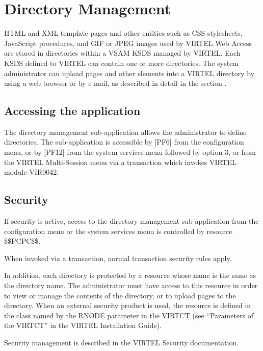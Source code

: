 \documentclass[letterpaper,10pt,english]{sphinxmanual}
\begin{document}
\section{Directory Management}
\label{\detokenize{User_Guide:directory-management}}\label{\detokenize{User_Guide:v457ug-directory-management}}
HTML and XML template pages and other entities such as CSS stylesheets, JavaScript procedures, and GIF or JPEG images used by VIRTEL Web Access are stored in directories within a VSAM KSDS managed by VIRTEL. Each KSDS defined to VIRTEL can contain one or more directories. The system administrator can upload pages and other elements into a VIRTEL directory by using a web browser or by e-mail, as described in detail in the section {\hyperref[\detokenize{User_Guide:v457ug-uploading-html-pages}]{}}.


\subsection{Accessing the application}
\label{\detokenize{User_Guide:accessing-the-application}}
The directory management sub-application allows the administrator to define directories. The sub-application is accessible by {[}PF6{]} from the configuration menu, or by {[}PF12{]} from the system services menu
followed by option 3, or from the VIRTEL Multi-Session menu via a transaction which invokes VIRTEL module VIR0042.


\subsection{Security}
\label{\detokenize{User_Guide:security}}
If security is active, access to the directory management sub-application from the configuration menu or the system services menu is controlled by resource \$\$PCPC\$\$.

When invoked via a transaction, normal transaction security rules apply.

In addition, each directory is protected by a resource whose name is the same as the directory name. The administrator must have access to this resource in order to view or manage the contents of the    directory, or to upload pages to the directory. When an external security product is used, the resource is defined in the class named by the RNODE parameter in the VIRTCT (see “Parameters of the VIRTCT” in the VIRTEL Installation Guide).

Security management is described in the VIRTEL Security documentation.
\end{document}

